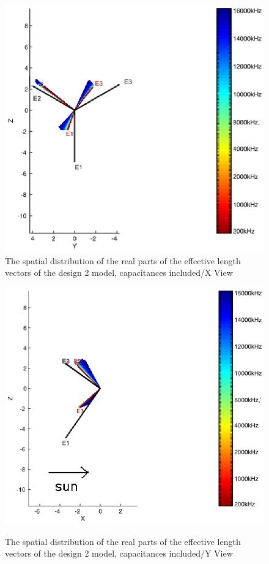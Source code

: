 \documentclass[a4paper,14pt]{extbook}
\begin{document}
\begin{figure}
\begin{center}
\includegraphics[width=12cm]{HeffVerteilungHGAD2-XView_caps.eps}\\
\caption{The spatial distribution of the real parts of the effective length vectors of the design 2 model, capacitances included/X View}\label{fig_heff_dist_HGA_D2_A_X_View_caps}
\includegraphics[width=12cm]{HeffVerteilungHGAD2-YView_caps.eps} \\
\caption{The spatial distribution of the real parts of the effective length vectors of the design 2 model, capacitances included/Y View}\label{fig_heff_dist_HGA_D2_A_Y_View_caps}
\end{center}
\end{figure}
\end{document}
